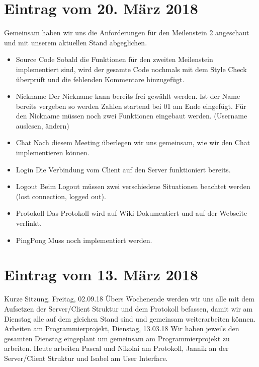 \documentclass{scrartcl}
\newcommand{\n}{\newline}
\begin{document}
\section*{Eintrag vom 20. März 2018}
Gemeinsam haben wir uns die Anforderungen für den Meilenstein 2 angeschaut und mit unserem aktuellen Stand abgeglichen.
\begin{itemize}
	\item Source Code\n
	Sobald die Funktionen für den zweiten Meilenstein implementiert sind, wird der gesamte Code nochmals mit dem Style Check überprüft und die fehlenden Kommentare hinzugefügt.
	\item Nickname\n
	Der Nickname kann bereits frei gewählt werden. Ist der Name bereits vergeben so werden Zahlen startend bei 01 am Ende eingefügt.
	Für den Nickname müssen noch zwei Funktionen eingebaut werden. (Username auslesen, ändern)
	\item Chat\n
	Nach diesem Meeting überlegen wir uns gemeinsam, wie wir den Chat implementieren können.
	\item Login\n
	Die Verbindung vom Client auf den Server funktioniert bereits.
	\item Logout\n
	Beim Logout müssen zwei verschiedene Situationen beachtet werden (lost connection, logged out).
	\item Protokoll\n
	Das Protokoll wird auf Wiki Dokumentiert und auf der Webseite verlinkt.
	\item Ping\/Pong\n
	Muss noch implementiert werden.
\end{itemize}

\section*{Eintrag vom 13. März 2018}
Kurze Sitzung, Freitag, 02.09.18 \n
Übers Wochenende werden wir uns alle mit dem Aufsetzen der Server/Client Struktur und dem Protokoll befassen, damit wir am Dienstag alle auf dem gleichen Stand sind und gemeinsam weiterarbeiten können. \n \n
Arbeiten am Programmierprojekt, Dienstag, 13.03.18 \n
Wir haben jeweils den gesamten Dienstag eingeplant um gemeinsam am Programmierprojekt zu arbeiten. Heute arbeiten Pascal und Nikolai am Protokoll, Jannik an der Server/Client Struktur und Isabel am User Interface.

\end{document}
